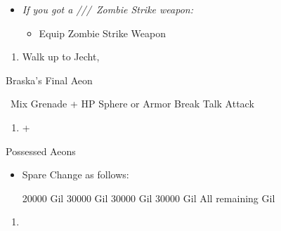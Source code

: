 \begin{equip}
    \begin{itemize}
        \item \textit{If you got a \lulu/\kimahri/\wakka/\rikku\ Zombie Strike weapon:}
        \begin{itemize}
            \item Equip Zombie Strike Weapon
        \end{itemize}
    \end{itemize}
\end{equip}
\begin{enumerate}[resume]
    \item Walk up to Jecht, \cs[4:30]
\end{enumerate}
\bothvfill\winvfill\lossvfill
\begin{battle}[180000]{Braska's Final Aeon}
    \begin{itemize}
        \switch{\yuna}{\rikku}
        \rikkuf \od\ Mix Grenade + HP Sphere or Armor Break
        \tidusf Talk
        \switch{\auron}{\yuna}
        \summon{\bahamut}
        \bahamutf Attack
    \end{itemize}
\end{battle}
\begin{enumerate}[resume]
    \item \cs+\skippablefmv[4:00]
\end{enumerate}
\begin{battle}{Possessed Aeons}
    \begin{itemize}
        \item Spare Change as follows:
        \begin{itemize}
            \valeforf \num{20000} Gil
            \ifritf \num{30000} Gil
            \ixionf \num{30000} Gil
            \shivaf \num{30000} Gil
            \bahamutf All remaining Gil
        \end{itemize}
    \end{itemize}
\end{battle}
\begin{enumerate}[resume]
    \item \cs[1:40]
\end{enumerate}
\colend
